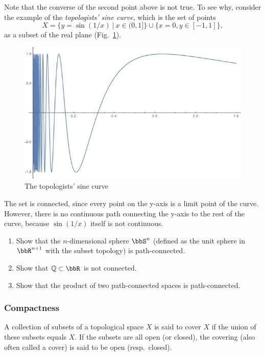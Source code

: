 Note that the converse of the second point above is not true. To see why, consider the example of the \emph{topologists' sine curve}, which is the set of points
\begin{equation}
X = \{y = \sin(1/x) ~|~ x\in(0,1]\} \cup \{ x=0, y\in[-1,1] \},
\end{equation}
as a subset of the real plane (Fig.\ \ref{tsine}).
\begin{figure}[tp]
    \centering
    \includegraphics[scale=0.3]{figures/Top_sin.jpg}
    \caption{The topologists' sine curve}
    \label{tsine}
\end{figure}
The set is connected, since every point on the y-axis is a limit point of the curve. However, there is no continuous path connecting the y-axis to the rest of the curve, because $\sin(1/x)$ itself is not continuous.

\begin{xca}
\begin{enumerate}
    \item Show that the $n$-dimensional sphere $\bbS^n$ (defined as the unit sphere in $\bbR^{n+1}$ with the subset topology) is path-connected.
    \item Show that $\mathbb{Q}\subset\bbR $ is not connected.
    \item Show that the product of two path-connected spaces is path-connected.
\end{enumerate}
\end{xca}

\subsubsection{Compactness}

\begin{defn}
A collection of subsets of a topological space $X$ is said to cover $X$ if the union of these subsets equals $X$. If the subsets are all open (or closed), the covering (also often called a cover) is said to be open (resp.~closed).
\end{defn}

